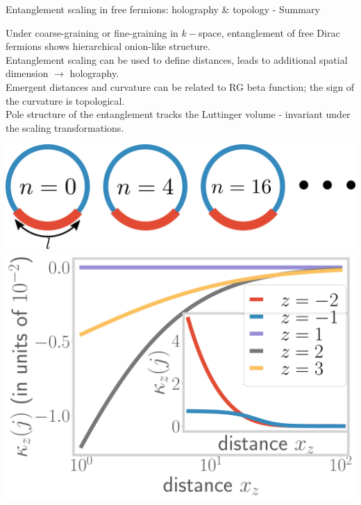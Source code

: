 \documentclass[8pt,aspectratio=169]{beamer}
\begin{document}
\begin{frame}{Entanglement scaling in free fermions: holography \& topology - Summary}
\hspace*{-40pt}
\begin{minipage}{0.65\textwidth}
\begin{itemize}
	\nitem Under coarse-graining or fine-graining in \(k-\)space, entanglement of free Dirac fermions shows hierarchical onion-like structure.\\[10pt]
	\nitem Entanglement scaling can be used to define distances, leads to additional spatial dimension \(\longrightarrow\) holography.\\[10pt]
	\nitem Emergent distances and curvature can be related to RG beta function; the sign of the curvature is topological.\\[10pt]
	\nitem Pole structure of the entanglement tracks the Luttinger volume - invariant under the scaling transformations.
\end{itemize}
\end{minipage}
\hspace*{5pt}
\begin{minipage}{0.41\textwidth}
\includegraphics[width=\textwidth]{figures/A_mi.pdf}
\includegraphics[width=\textwidth]{curvature-pos.pdf}
\end{minipage}
\hspace*{-40pt}
\end{frame}
\end{document}
